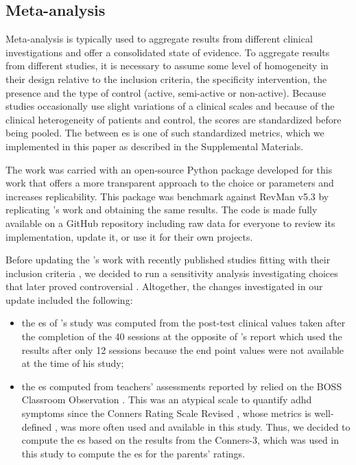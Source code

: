 \subsection{Meta-analysis}

Meta-analysis is typically used to aggregate results from different clinical investigations and offer a consolidated 
state of evidence. To aggregate results from different studies, it is necessary to assume some level of homogeneity 
in their design relative to the inclusion criteria, the specificity intervention, the presence and the type of control
(active, semi-active or 
non-active). Because studies occasionally use slight variations of a clinical scales and because of the clinical heterogeneity of patients and control, 
the scores are standardized before being pooled. 
The between \gls{es} is one of such standardized metrics, which we implemented in this paper as described 
in the Supplemental Materials. 

The work was carried with an open-source 
Python package developed for this work that offers a more transparent approach to the choice or parameters 
and increases replicability. This package was benchmark against RevMan v5.3 \citep{RevMan}
by replicating \citet{Cortese2016}'s work and obtaining the same results. The code is made fully available 
on a GitHub repository \citep{Bussalb2018} including raw data for everyone to review its implementation, update it, or 
use it for their own projects. 
 
Before updating the \citet{Cortese2016}'s work with recently published studies fitting with their inclusion criteria 
\citep{Strehl2017, Baumeister2016}, we decided to run a sensitivity analysis investigating choices that later 
proved controversial \citep{Micoulaud2016}. Altogether, the changes investigated in our update included the following:
\begin{itemize}
\item the \gls{es} of \citeauthor{Arnold2014}'s study was computed from the post-test clinical values taken after the completion of the 40 sessions 
  at the opposite of \citet{Cortese2016}'s report which used the results after only 12 sessions because the end point
  values were not available at the time of his study;
\item the \gls{es} computed from teachers' assessments reported by \citet{Steiner2014} relied on the BOSS Classroom Observation \citep{Shapiro2010}. This
  was an atypical scale to quantify \gls{adhd} symptoms since the Conners Rating Scale Revised \citep{Conners1998}
\citep{Christiansen2014, Bluschke2016}, whose metrics is well-defined \citep{Collett2003, Epstein2012}, was more
often used and available in this study. Thus, we decided to compute
the \gls{es} based on the results from the Conners-3, which was used in this study to compute the \gls{es} for the parents' ratings.  
\end{itemize} 

